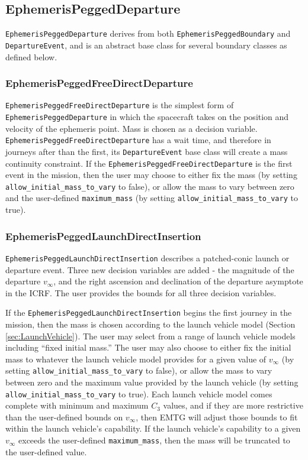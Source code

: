 \subsection{EphemerisPeggedDeparture}
\label{subsec:ephemerispeggeddeparture}

\texttt{EphemerisPeggedDeparture} derives from both \texttt{EphemerisPeggedBoundary} and \texttt{DepartureEvent}, and is an abstract base class for several boundary classes as defined below.

\subsubsection{EphemerisPeggedFreeDirectDeparture}
\label{subsubsec:EphemerisPeggedFreeDirectDeparture}

\texttt{EphemerisPeggedFreeDirectDeparture} is the simplest form of \texttt{EphemerisPeggedDeparture} in which the spacecraft takes on the position and velocity of the ephemeris point. Mass is chosen as a decision variable. \texttt{EphemerisPeggedFreeDirectDeparture} has a wait time, and therefore in journeys after than the first, its \texttt{DepartureEvent} base class will create a mass continuity constraint. If the \texttt{EphemerisPeggedFreeDirectDeparture} is the first event in the mission, then the user may choose to either fix the mass (by setting \texttt{allow\_initial\_mass\_to\_vary} to false), or allow the mass to vary between zero and the user-defined \texttt{maximum\_mass} (by setting \texttt{allow\_initial\_mass\_to\_vary} to true).


\subsubsection{EphemerisPeggedLaunchDirectInsertion}
\label{subsubsec:EphemerisPeggedLaunchDirectInsertion}

\texttt{EphemerisPeggedLaunchDirectInsertion} describes a patched-conic launch or departure event. Three new decision variables are added - the magnitude of the departure $v_\infty$, and the right ascension and declination of the departure asymptote in the \ac{ICRF}. The user provides the bounds for all three decision variables.

If the \texttt{EphemerisPeggedLaunchDirectInsertion} begins the first journey in the mission, then the mass is chosen according to the launch vehicle model (Section \ref{sec:LaunchVehicle}). The user may select from a range of launch vehicle models including ``fixed initial mass.'' The user may also choose to either fix the initial mass to whatever the launch vehicle model provides for a given value of $v_\infty$ (by setting \texttt{allow\_initial\_mass\_to\_vary} to false), or allow the mass to vary between zero and the maximum value provided by the launch vehicle (by setting \texttt{allow\_initial\_mass\_to\_vary} to true). Each launch vehicle model comes complete with minimum and maximum $C_3$ values, and if they are more restrictive than the user-defined bounds on $v_\infty$, then \ac{EMTG} will adjust those bounds to fit within the launch vehicle's capability. If the launch vehicle's capability to a given $v_\infty$ exceeds the user-defined \texttt{maximum\_mass}, then the mass will be truncated to the user-defined value.

